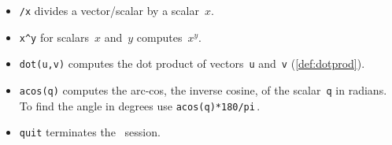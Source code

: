 \begin{itemize}
\item \verb|/x| divides a vector\slash scalar by a scalar~\(x\).

\item \verb|x^y| for scalars~\(x\) and~\(y\) computes~\(x^y\).

\item \verb|dot(u,v)| computes the {dot product} of vectors~\verb|u| and~\verb|v| (\autoref{def:dotprod}).

\item \verb|acos(q)| computes the {arc-cos}, the {inverse cosine}, of the scalar~\verb|q| in radians.  
To find the angle in degrees use \verb|acos(q)*180/pi|\,.

\item \verb|quit| terminates the \script\ session.





\end{itemize}


\makeanswers
